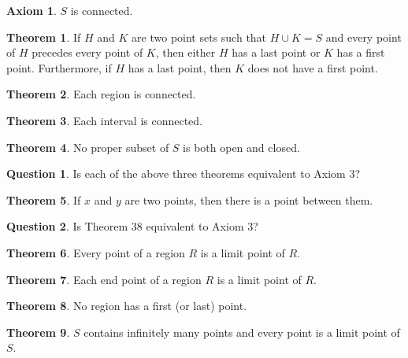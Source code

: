 \documentclass{article}
\theoremstyle{definition}
\newtheorem{question}{Question}
\newtheorem{axiom}{Axiom}
\newtheorem{theorem}{Theorem}
\theoremstyle{definition}
\theoremstyle{plain}
\begin{document}
\begin{axiom}
  \label{ax:connected}
  $S$ is connected.
\end{axiom}

\begin{theorem}
   If $H$ and $K$ are two point sets such that \mbox{$H \cup K =
  S$} and every point of $H$ precedes every point of $K$, then either $H$ has a
  last point or $K$ has a first point.  Furthermore, if $H$ has a last point,
  then $K$ does not have a first point.
\end{theorem}

\begin{theorem}
  Each region is connected.
\end{theorem}

\begin{theorem}
  Each interval is connected.
\end{theorem}

\begin{theorem}
  No proper subset of $S$ is both open and closed.
\end{theorem}

\begin{question}
  Is each of the above three theorems equivalent to Axiom 3?
\end{question}

\begin{theorem}
  If $x$ and $y$ are two points, then there is a point between them.
\end{theorem}

\begin{question}
  Is Theorem 38 equivalent to Axiom 3?
\end{question}

\begin{theorem}
  Every point of a region $R$ is a limit point of $R$.
\end{theorem}

\begin{theorem}
  Each end point of a region $R$ is a limit point of $R$.
\end{theorem}

\begin{theorem}
  No region has a first (or last) point.
\end{theorem}

\begin{theorem}
  $S$ contains infinitely many points and every point is a limit point of $S$.
\end{theorem}
\end{document}
